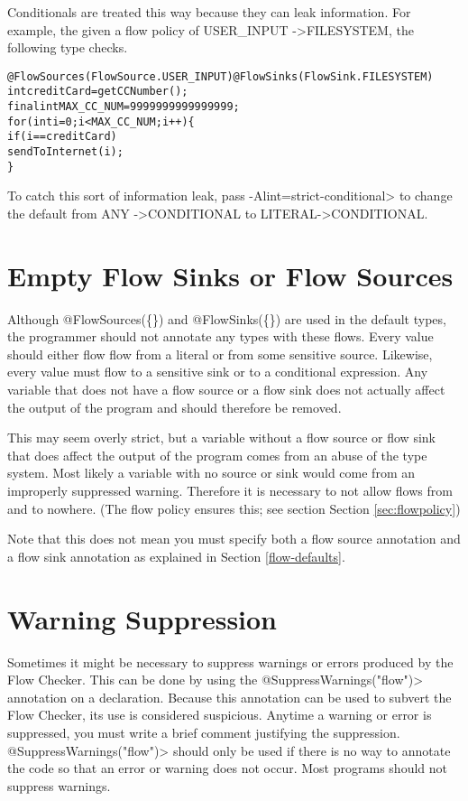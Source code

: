 Conditionals are treated this way because they can leak information. For example, the given a flow policy of  USER\_INPUT -\textgreater FILESYSTEM, the following type checks.

\begin{alltt}
@FlowSources(FlowSource.USER_INPUT)@FlowSinks(FlowSink.FILESYSTEM)
int creditCard = getCCNumber();
final int MAX\_CC\_NUM=9999999999999999;
for (int i = 0 ; i < MAX\_CC\_NUM ; i++)\{
   if ( i == creditCard )
        sendToInternet(i);
\}
\end{alltt}

To catch this sort of information leak, pass
 \<-Alint=strict-conditional> to change the default from ANY -\textgreater CONDITIONAL to 
 LITERAL-\textgreater CONDITIONAL. 



\section{Empty Flow Sinks or Flow Sources}

Although @FlowSources(\{\}) and @FlowSinks(\{\}) are used in the default types, 
 the programmer should not annotate any types with these flows.  Every value 
 should either flow flow from a literal or from some sensitive source.  Likewise, every value
 must flow to a sensitive sink or to a conditional expression.  Any variable that does not
 have a flow source or a flow sink  does not actually affect the
  output of the program and should therefore be removed.  
  
  This may seem overly strict, but a variable without a flow source or flow sink that does affect
  the output of the program comes from an abuse of the type system.   Most likely  a variable with
   no source or sink would come from  an improperly suppressed warning. Therefore it is necessary to 
  not allow  flows from and to nowhere.  (The flow policy ensures this; see section 
  Section \ref{sec:flowpolicy})
  
  Note that this does not mean you must specify both a flow source annotation and 
  a flow sink annotation as explained in Section \ref{flow-defaults}.

 
 \section{Warning Suppression}
 
 Sometimes it might be necessary to suppress warnings or errors produced by the
  Flow Checker.  This can be done by using the  \<@SuppressWarnings("flow")> annotation
   on a declaration.  Because this annotation can be used to subvert the Flow Checker, its use
   is considered suspicious.  Anytime a warning or error is suppressed, you must 
   write a brief comment justifying the suppression.     \<@SuppressWarnings("flow")> should
   only be used if there is no way to annotate the code so that an error or warning does not occur. 
   Most programs should not suppress warnings. 
